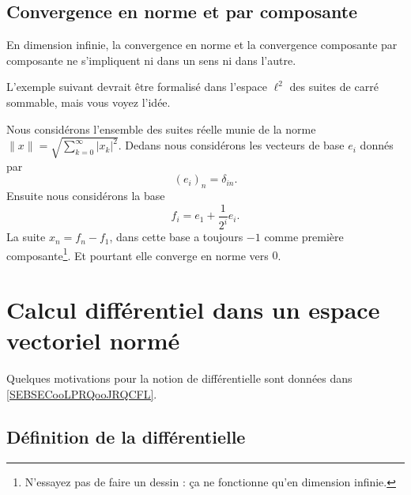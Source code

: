 \subsection{Convergence en norme et par composante}

En dimension infinie, la convergence en norme et la convergence composante par composante ne s'impliquent ni dans un sens ni dans l'autre.

L'exemple suivant devrait être formalisé dans l'espace \( \ell^2\) des suites de carré sommable, mais vous voyez l'idée.
\begin{example}
	Nous considérons l'ensemble des suites réelle munie de la norme \( \| x \|=\sqrt{ \sum_{k=0}^{\infty}| x_k |^2 } \). Dedans nous considérons les vecteurs de base \( e_i\) donnés par
	\begin{equation}
		(e_i)_n=\delta_{in}.
	\end{equation}
	Ensuite nous considérons la base
	\begin{equation}
		f_i=e_1+\frac{1}{ 2^i }e_i.
	\end{equation}
	La suite \( x_n=f_n-f_1\), dans cette base a toujours \( -1\) comme première composante\footnote{N'essayez pas de faire un dessin : ça ne fonctionne qu'en dimension infinie.}. Et pourtant elle converge en norme vers \( 0\).
\end{example}

\section{Calcul différentiel dans un espace vectoriel normé}
\label{SecLStKEmc}

Quelques motivations pour la notion de différentielle sont données dans \ref{SEBSECooLPRQooJRQCFL}.

\subsection{Définition de la différentielle}

